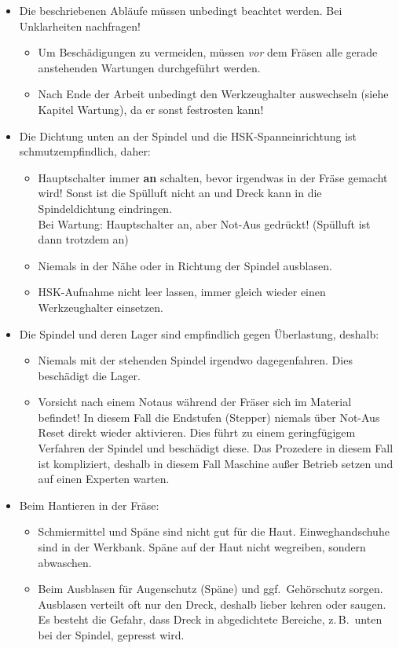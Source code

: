\documentclass{\basedir/fablab-document}
\begin{document}
\begin{itemize}
 \item Die beschriebenen Abläufe müssen unbedingt beachtet werden. Bei Unklarheiten nachfragen!
	\begin{itemize}
	\item Um Beschädigungen zu vermeiden, müssen \emph{vor} dem Fräsen alle gerade anstehenden Wartungen durchgeführt werden.
	\item Nach Ende der Arbeit unbedingt den Werkzeughalter auswechseln (siehe Kapitel Wartung), da er sonst festrosten kann!
	\end{itemize}
 \item Die Dichtung unten an der Spindel und die HSK-Spanneinrichtung ist schmutzempfindlich, daher:
 \begin{itemize}
  \item Hauptschalter immer \textbf{an} schalten, bevor irgendwas in der Fräse gemacht wird! Sonst ist die Spülluft nicht an und Dreck kann in die Spindeldichtung eindringen.\\Bei Wartung: Hauptschalter an, aber Not-Aus gedrückt! (Spülluft ist dann trotzdem an)
  \item Niemals in der Nähe oder in Richtung der Spindel ausblasen.
  \item HSK-Aufnahme nicht leer lassen, immer gleich wieder einen Werkzeughalter einsetzen.
 \end{itemize}
\item Die Spindel und deren Lager sind empfindlich gegen Überlastung, deshalb: 
 \begin{itemize}
  \item Niemals mit der stehenden Spindel irgendwo dagegenfahren. Dies beschädigt die Lager.
  \item Vorsicht nach einem Notaus während der Fräser sich im Material befindet! In diesem Fall die Endstufen (Stepper) niemals über Not-Aus Reset direkt wieder aktivieren. Dies führt zu einem geringfügigem Verfahren der Spindel und beschädigt diese. 
Das Prozedere in diesem Fall ist kompliziert, deshalb in diesem Fall Maschine außer Betrieb setzen und auf einen Experten warten.
\end{itemize}
	\item Beim Hantieren in der Fräse:
\begin{itemize}
	\item Schmiermittel und Späne sind nicht gut für die Haut. Einweghandschuhe sind in der Werkbank. Späne auf der Haut nicht wegreiben, sondern abwaschen.
	\item Beim Ausblasen für Augenschutz (Späne) und ggf.\  Gehörschutz sorgen. Ausblasen verteilt oft nur den Dreck, deshalb lieber kehren oder saugen. Es besteht die Gefahr, dass Dreck in abgedichtete Bereiche, z.\,B.\  unten bei der Spindel, gepresst wird.

\end{itemize}
\end{itemize}
\end{document}
